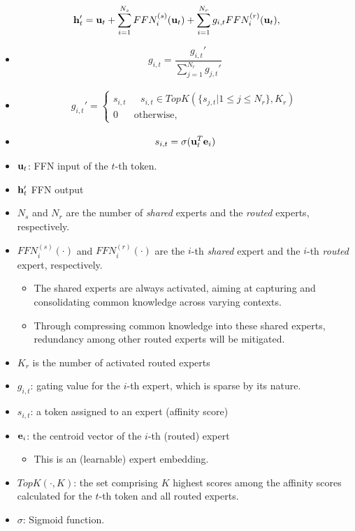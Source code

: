 \begin{align*}
	{\mathbf{h}}_t' = {\mathbf{u}}_t+\sum^{N_s}_{i=1}FFN_i^{(s)}({\mathbf{u}}_t)+\sum^{N_r}_{i=1}g_{i,t}FFN_i^{(r)}({\mathbf{u}}_t),
\end{align*}
\begin{itemize}
	\item 
		$$g_{i,t} = \frac{g_{i,t}'}{\sum^{N_r}_{j=1}g_{j,t}'}$$
	\item 
		\begin{align*}
			g_{i,t}' = \begin{cases}
				s_{i,t}&\text{ } s_{i,t}\in TopK(\{s_{j,t}|1\leq j \leq N_r\}, K_r)\\
				0&\text{otherwise,}
			\end{cases}
		\end{align*}
	\item 
		$$s_{i,t} = \sigma({\mathbf{u}}_t^T{\mathbf{e}}_i)$$
	\item ${\mathbf{u}}_t$: FFN input of the $t$-th token. 
	\item ${\mathbf{h}}_t'$ FFN output
	\item $N_s$ and $N_r$ are the number of \textit{shared} experts and the \textit{routed} experts, respectively.
	\item $FFN_i^{(s)}(\cdot)$ and $FFN_i^{(r)}(\cdot)$ are the $i$-th \textit{shared} expert and the $i$-th \textit{routed} expert, respectively.
		\begin{itemize}
			\item The shared experts are always activated, aiming at capturing and consolidating common knowledge across varying contexts. 
			\item Through compressing common knowledge into these shared experts, redundancy among other routed experts will be mitigated.
		\end{itemize}
	\item $K_r$ is the number of activated routed experts
	\item $g_{i,t}$: gating value for the $i$-th expert, which is sparse by its nature. 
	\item $s_{i,t}$: a token assigned to an expert (\ie affinity score)
	\item ${\mathbf{e}}_i$: the centroid vector of the $i$-th (routed) expert 
		\begin{itemize}
			\item This is an (learnable) expert embedding. 
		\end{itemize}
	\item $TopK(\cdot, K)$: the set comprising $K$ highest scores among the affinity scores calculated for the $t$-th token and all routed experts.
	\item $\sigma$: Sigmoid function.
\end{itemize}


